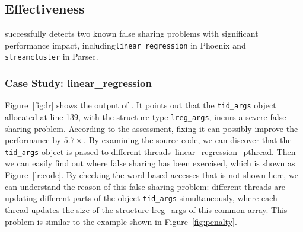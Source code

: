 
 
\subsection{Effectiveness}
\label{sec:effectiveness}

\cheetah{} successfully detects two known false sharing problems with significant performance impact, including\texttt{linear\_regression} in Phoenix and \texttt{streamcluster} in Parsec. 



\subsubsection{Case Study: linear\_regression}
Figure~\ref{fig:lr} shows the output of \cheetah{}. It points out that the {\tt tid\_args} object allocated at line 139, with the structure type {\tt lreg\_args}, incurs a severe false sharing problem. According to the assessment, fixing it can possibly improve the performance by $5.7\times$. By examining the source code, we can discover that the {\tt tid\_args} object is passed to different threads--linear\_regression\_pthread. Then we can easily find out where false sharing has been exercised, which is shown as Figure~\ref{lr:code}. By checking the word-based accesses that is not shown here, we can understand the reason of this false sharing problem: different threads are updating different parts of the object {\tt tid\_args} simultaneously, where each thread updates the size of the structure lreg\_args of this common array. This problem is similar to the example shown in Figure~\ref{fig:penalty}. 

